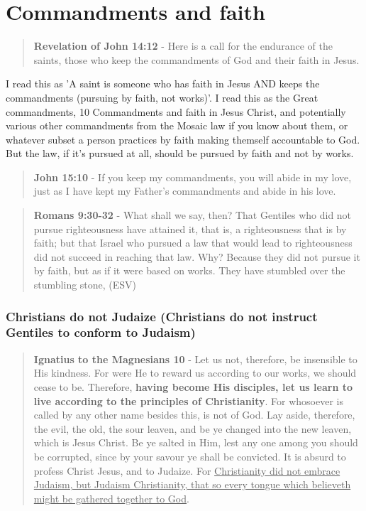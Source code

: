 \documentclass[11pt]{article}
\begin{document}
\section{Commandments and faith}
\label{sec:org7ae859a}
\begin{quote}
\textbf{Revelation of John 14:12} - Here is a call for the endurance of the saints, those who keep the commandments of God and their faith in Jesus.
\end{quote}

I read this as 'A saint is someone who has faith in Jesus AND keeps the commandments (pursuing by faith, not works)'.
I read this as the Great commandments, 10 Commandments and faith in Jesus Christ, and potentially various other commandments from the Mosaic law if you know about them, or whatever subset a person practices by faith making themself accountable to God.
But the law, if it's pursued at all, should be pursued by faith and not by works.

\begin{quote}
\textbf{John 15:10} - If you keep my commandments, you will abide in my love, just as I have kept my Father's commandments and abide in his love.
\end{quote}

\begin{quote}
\textbf{Romans 9:30-32} - What shall we say, then? That Gentiles who did not pursue righteousness have attained it, that is, a righteousness that is by faith; but that Israel who pursued a law that would lead to righteousness did not succeed in reaching that law. Why? Because they did not pursue it by faith, but as if it were based on works. They have stumbled over the stumbling stone, (ESV)
\end{quote}

\subsubsection{Christians do not Judaize (Christians do not instruct Gentiles to conform to Judaism)}
\label{sec:orgbdc8109}
\begin{quote}
\textbf{Ignatius to the Magnesians 10} - Let us not, therefore, be insensible to His kindness. For were He to reward us according to our works, we should cease to be. Therefore, \textbf{having become His disciples, let us learn to live according to the principles of Christianity}. For whosoever is called by any other name besides this, is not of God. Lay aside, therefore, the evil, the old, the sour leaven, and be ye changed into the new leaven, which is Jesus Christ. Be ye salted in Him, lest any one among you should be corrupted, since by your savour ye shall be convicted. It is absurd to profess Christ Jesus, and to Judaize. For \uline{Christianity did not embrace Judaism, but Judaism Christianity, that so every tongue which believeth might be gathered together to God}.
\end{quote}
\end{document}
